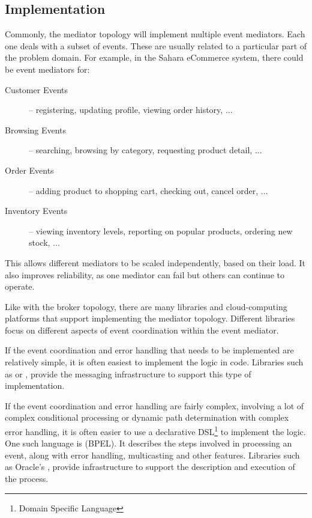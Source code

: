 \subsection{Implementation}

Commonly, the mediator topology will implement multiple event mediators.
Each one deals with a subset of events.
These are usually related to a particular part of the problem domain.
For example, in the Sahara eCommerce system, there could be event mediators for:
\begin{description}
    \item[Customer Events] -- registering, updating profile, viewing order history, ...
    \item[Browsing Events] -- searching, browsing by category, requesting product detail, ...
    \item[Order Events] -- adding product to shopping cart, checking out, cancel order, ...
    \item[Inventory Events] -- viewing inventory levels, reporting on popular products, ordering new stock, ...
\end{description}
This allows different mediators to be scaled independently, based on their load.
It also improves reliability, as one mediator can fail but others can continue to operate.

Like with the broker topology, there are many libraries and cloud-computing platforms that support implementing the mediator topology.
Different libraries focus on different aspects of event coordination within the event mediator.

If the event coordination and error handling that needs to be implemented are relatively simple,
it is often easiest to implement the logic in code.
Libraries such as 
or ,
provide the messaging infrastructure to support this type of implementation.

If the event coordination and error handling are fairly complex,
involving a lot of complex conditional processing or dynamic path determination with complex error handling,
it is often easier to use a declarative DSL\footnote{Domain Specific Language} to implement the logic.
One such language is  (BPEL).
It describes the steps involved in processing an event, along with error handling, multicasting and other features.
Libraries such as Oracle's ,
provide infrastructure to support the description and execution of the process.

